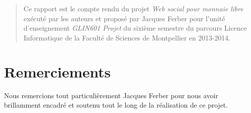\maketitle

\begin{abstract}
Ce rapport est le compte rendu du projet \emph{Web social pour monnaie libre} exécuté par les auteurs et proposé par Jacques Ferber pour l'unité d'enseignement \emph{GLIN601 Projet} du sixième semestre du parcours Licence Informatique de la Faculté de Sciences de Montpellier en 2013-2014.
\end{abstract}

\chapter*{Remerciements}
Nous remercions tout particulièrement Jacques Ferber pour nous avoir brillamment encadré et soutenu tout le long de la réalisation de ce projet.

\tableofcontents























\appendix





\medskip
\printbibliography

